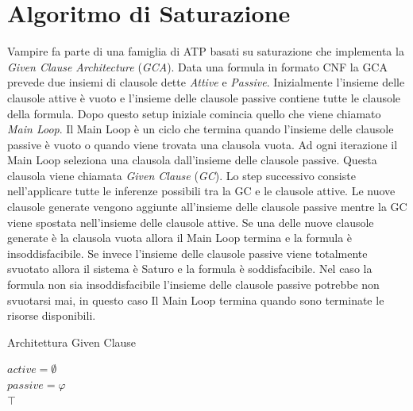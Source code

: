 \documentclass[./main.tex]{subfiles}
\begin{document}
\section{Algoritmo di Saturazione} \label{sec:vampire_saturazione}
Vampire fa parte di una famiglia di ATP basati su saturazione che implementa la \textit{Given Clause Architecture} (\textit{GCA}).
Data una formula in formato CNF la GCA prevede due insiemi di clausole dette \textit{Attive} e \textit{Passive}.
Inizialmente l'insieme delle clausole attive è vuoto e l'insieme delle clausole passive contiene tutte le clausole della formula.
Dopo questo setup iniziale comincia quello che viene chiamato \textit{Main Loop}.
Il Main Loop è un ciclo che termina quando l'insieme delle clausole passive è vuoto o quando viene trovata una clausola vuota.
Ad ogni iterazione il Main Loop seleziona una clausola dall'insieme delle clausole passive. 
Questa clausola viene chiamata \textit{Given Clause} (\textit{GC}). 
Lo step successivo consiste nell'applicare tutte le inferenze possibili tra la GC e le clausole attive.
Le nuove clausole generate vengono aggiunte all'insieme delle clausole passive mentre la GC viene spostata nell'insieme delle clausole attive.
Se una delle nuove clausole generate è la clausola vuota allora il Main Loop termina e la formula è insoddisfacibile.
Se invece l'insieme delle clausole passive viene totalmente svuotato allora il sistema è Saturo e la formula è soddisfacibile.
Nel caso la formula non sia insoddisfacibile l'insieme delle clausole passive potrebbe non svuotarsi mai,
in questo caso Il Main Loop termina quando sono terminate le risorse disponibili.

\begin{algorithm}[H]
    \caption{Architettura Given Clause}


    $active = \emptyset$ \\
    $passive = \varphi$ \\

    \Return $\top$\;
\end{algorithm}
\end{document}

